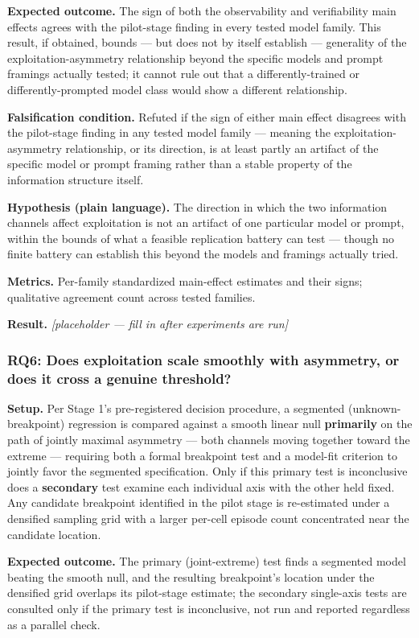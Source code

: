 \documentclass[11pt]{article}
\newcommand{\ph}{\textit{[placeholder --- fill in after experiments are run]}}
\begin{document}
\textbf{Expected outcome.} The sign of both the observability and verifiability main effects agrees with the pilot-stage finding in every tested model family. This result, if obtained, bounds --- but does not by itself establish --- generality of the exploitation-asymmetry relationship beyond the specific models and prompt framings actually tested; it cannot rule out that a differently-trained or differently-prompted model class would show a different relationship.

\textbf{Falsification condition.} Refuted if the sign of either main effect disagrees with the pilot-stage finding in any tested model family --- meaning the exploitation-asymmetry relationship, or its direction, is at least partly an artifact of the specific model or prompt framing rather than a stable property of the information structure itself.

\textbf{Hypothesis (plain language).} The direction in which the two information channels affect exploitation is not an artifact of one particular model or prompt, within the bounds of what a feasible replication battery can test --- though no finite battery can establish this beyond the models and framings actually tried.

\textbf{Metrics.} Per-family standardized main-effect estimates and their signs; qualitative agreement count across tested families.

\textbf{Result.} \ph

\subsubsection{RQ6: Does exploitation scale smoothly with asymmetry, or does it cross a genuine threshold?}
\textbf{Setup.} Per Stage 1's pre-registered decision procedure, a segmented (unknown-breakpoint) regression is compared against a smooth linear null \textbf{primarily} on the path of jointly maximal asymmetry --- both channels moving together toward the extreme --- requiring both a formal breakpoint test and a model-fit criterion to jointly favor the segmented specification. Only if this primary test is inconclusive does a \textbf{secondary} test examine each individual axis with the other held fixed. Any candidate breakpoint identified in the pilot stage is re-estimated under a densified sampling grid with a larger per-cell episode count concentrated near the candidate location.

\textbf{Expected outcome.} The primary (joint-extreme) test finds a segmented model beating the smooth null, and the resulting breakpoint's location under the densified grid overlaps its pilot-stage estimate; the secondary single-axis tests are consulted only if the primary test is inconclusive, not run and reported regardless as a parallel check.
\end{document}
